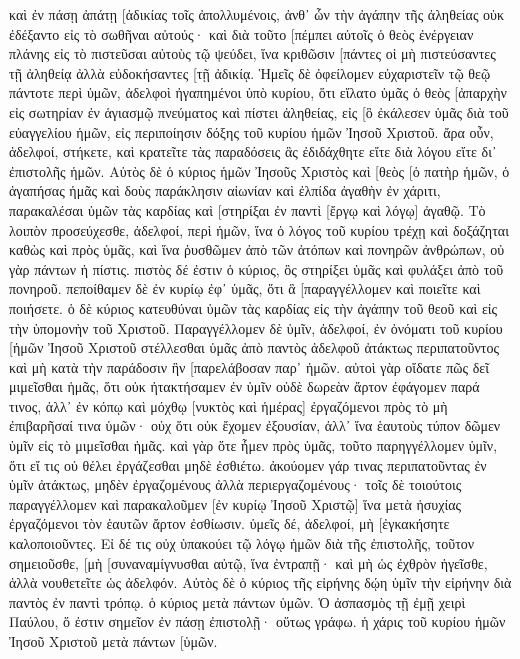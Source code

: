καὶ ἐν πάσῃ ἀπάτῃ [ἀδικίας τοῖς ἀπολλυμένοις, ἀνθ᾽ ὧν τὴν ἀγάπην τῆς ἀληθείας οὐκ ἐδέξαντο εἰς τὸ σωθῆναι αὐτούς· 
καὶ διὰ τοῦτο [πέμπει αὐτοῖς ὁ θεὸς ἐνέργειαν πλάνης εἰς τὸ πιστεῦσαι αὐτοὺς τῷ ψεύδει, 
ἵνα κριθῶσιν [πάντες οἱ μὴ πιστεύσαντες τῇ ἀληθείᾳ ἀλλὰ εὐδοκήσαντες [τῇ ἀδικίᾳ. 
Ἡμεῖς δὲ ὀφείλομεν εὐχαριστεῖν τῷ θεῷ πάντοτε περὶ ὑμῶν, ἀδελφοὶ ἠγαπημένοι ὑπὸ κυρίου, ὅτι εἵλατο ὑμᾶς ὁ θεὸς [ἀπαρχὴν εἰς σωτηρίαν ἐν ἁγιασμῷ πνεύματος καὶ πίστει ἀληθείας, 
εἰς [ὃ ἐκάλεσεν ὑμᾶς διὰ τοῦ εὐαγγελίου ἡμῶν, εἰς περιποίησιν δόξης τοῦ κυρίου ἡμῶν Ἰησοῦ Χριστοῦ. 
ἄρα οὖν, ἀδελφοί, στήκετε, καὶ κρατεῖτε τὰς παραδόσεις ἃς ἐδιδάχθητε εἴτε διὰ λόγου εἴτε δι᾽ ἐπιστολῆς ἡμῶν. 
Αὐτὸς δὲ ὁ κύριος ἡμῶν Ἰησοῦς Χριστὸς καὶ [θεὸς [ὁ πατὴρ ἡμῶν, ὁ ἀγαπήσας ἡμᾶς καὶ δοὺς παράκλησιν αἰωνίαν καὶ ἐλπίδα ἀγαθὴν ἐν χάριτι, 
παρακαλέσαι ὑμῶν τὰς καρδίας καὶ [στηρίξαι ἐν παντὶ [ἔργῳ καὶ λόγῳ] ἀγαθῷ. 
Τὸ λοιπὸν προσεύχεσθε, ἀδελφοί, περὶ ἡμῶν, ἵνα ὁ λόγος τοῦ κυρίου τρέχῃ καὶ δοξάζηται καθὼς καὶ πρὸς ὑμᾶς, 
καὶ ἵνα ῥυσθῶμεν ἀπὸ τῶν ἀτόπων καὶ πονηρῶν ἀνθρώπων, οὐ γὰρ πάντων ἡ πίστις. 
πιστὸς δέ ἐστιν ὁ κύριος, ὃς στηρίξει ὑμᾶς καὶ φυλάξει ἀπὸ τοῦ πονηροῦ. 
πεποίθαμεν δὲ ἐν κυρίῳ ἐφ᾽ ὑμᾶς, ὅτι ἃ [παραγγέλλομεν καὶ ποιεῖτε καὶ ποιήσετε. 
ὁ δὲ κύριος κατευθύναι ὑμῶν τὰς καρδίας εἰς τὴν ἀγάπην τοῦ θεοῦ καὶ εἰς τὴν ὑπομονὴν τοῦ Χριστοῦ. 
Παραγγέλλομεν δὲ ὑμῖν, ἀδελφοί, ἐν ὀνόματι τοῦ κυρίου [ἡμῶν Ἰησοῦ Χριστοῦ στέλλεσθαι ὑμᾶς ἀπὸ παντὸς ἀδελφοῦ ἀτάκτως περιπατοῦντος καὶ μὴ κατὰ τὴν παράδοσιν ἣν [παρελάβοσαν παρ᾽ ἡμῶν. 
αὐτοὶ γὰρ οἴδατε πῶς δεῖ μιμεῖσθαι ἡμᾶς, ὅτι οὐκ ἠτακτήσαμεν ἐν ὑμῖν 
οὐδὲ δωρεὰν ἄρτον ἐφάγομεν παρά τινος, ἀλλ᾽ ἐν κόπῳ καὶ μόχθῳ [νυκτὸς καὶ ἡμέρας] ἐργαζόμενοι πρὸς τὸ μὴ ἐπιβαρῆσαί τινα ὑμῶν· 
οὐχ ὅτι οὐκ ἔχομεν ἐξουσίαν, ἀλλ᾽ ἵνα ἑαυτοὺς τύπον δῶμεν ὑμῖν εἰς τὸ μιμεῖσθαι ἡμᾶς. 
καὶ γὰρ ὅτε ἦμεν πρὸς ὑμᾶς, τοῦτο παρηγγέλλομεν ὑμῖν, ὅτι εἴ τις οὐ θέλει ἐργάζεσθαι μηδὲ ἐσθιέτω. 
ἀκούομεν γάρ τινας περιπατοῦντας ἐν ὑμῖν ἀτάκτως, μηδὲν ἐργαζομένους ἀλλὰ περιεργαζομένους· 
τοῖς δὲ τοιούτοις παραγγέλλομεν καὶ παρακαλοῦμεν [ἐν κυρίῳ Ἰησοῦ Χριστῷ] ἵνα μετὰ ἡσυχίας ἐργαζόμενοι τὸν ἑαυτῶν ἄρτον ἐσθίωσιν. 
ὑμεῖς δέ, ἀδελφοί, μὴ [ἐγκακήσητε καλοποιοῦντες. 
Εἰ δέ τις οὐχ ὑπακούει τῷ λόγῳ ἡμῶν διὰ τῆς ἐπιστολῆς, τοῦτον σημειοῦσθε, [μὴ [συναναμίγνυσθαι αὐτῷ, ἵνα ἐντραπῇ· 
καὶ μὴ ὡς ἐχθρὸν ἡγεῖσθε, ἀλλὰ νουθετεῖτε ὡς ἀδελφόν. 
Αὐτὸς δὲ ὁ κύριος τῆς εἰρήνης δῴη ὑμῖν τὴν εἰρήνην διὰ παντὸς ἐν παντὶ τρόπῳ. ὁ κύριος μετὰ πάντων ὑμῶν. 
Ὁ ἀσπασμὸς τῇ ἐμῇ χειρὶ Παύλου, ὅ ἐστιν σημεῖον ἐν πάσῃ ἐπιστολῇ· οὕτως γράφω. 
ἡ χάρις τοῦ κυρίου ἡμῶν Ἰησοῦ Χριστοῦ μετὰ πάντων [ὑμῶν. 
